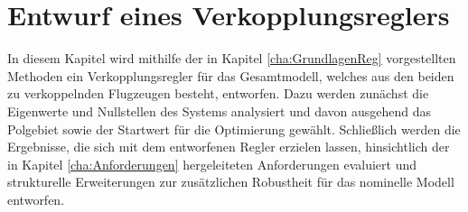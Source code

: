 \chapter{Entwurf eines Verkopplungsreglers}\label{cha:Regler}
In diesem Kapitel wird mithilfe der in Kapitel \ref{cha:GrundlagenReg} vorgestellten Methoden ein Verkopplungsregler für das Gesamtmodell, welches aus den beiden zu verkoppelnden Flugzeugen besteht, entworfen. Dazu werden zunächst die Eigenwerte und Nullstellen des Systems analysiert und davon ausgehend das Polgebiet sowie der Startwert für die Optimierung gewählt. Schließlich werden die Ergebnisse, die sich mit dem entworfenen Regler erzielen lassen, hinsichtlich der in Kapitel \ref{cha:Anforderungen} hergeleiteten Anforderungen evaluiert und strukturelle Erweiterungen zur zusätzlichen Robustheit für das nominelle Modell entworfen.

